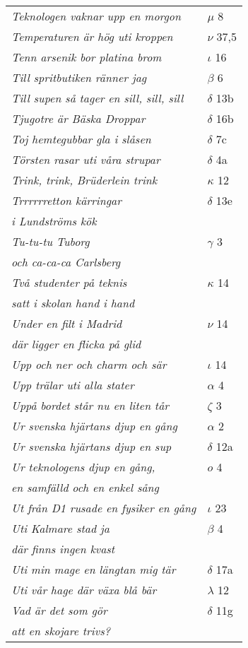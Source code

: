 \documentclass[a6paper,10pt]{article}
\begin{document}
\newpage
\setlength{\oddsidemargin}{-0.37in}
\begin{table}[!h]
\begin{tabular}{l l}
\textit{Teknologen vaknar upp en morgon}    &$\mu$ 8\\
\textit{Temperaturen är hög uti kroppen}	&$\nu$ 37,5\\
\textit{Tenn arsenik bor platina brom}	&$\iota$ 16\\
\textit{Till spritbutiken ränner jag}	&$\beta$ 6\\
\textit{Till supen så tager en sill, sill, sill}	&$\delta$ 13b\\
\textit{Tjugotre är Bäska Droppar}	&$\delta$ 16b\\
\textit{Toj hemtegubbar gla i slåsen}	&$\delta$ 7c\\
\textit{Törsten rasar uti våra strupar}	&$\delta$ 4a\\
\textit{Trink, trink, Brüderlein trink}	&$\kappa$ 12\\
\textit{Trrrrrretton kärringar}	&$\delta$ 13e\\
\textit{i Lundströms kök} &\\
\textit{Tu-tu-tu Tuborg}	&$\gamma$ 3\\
\textit{och ca-ca-ca Carlsberg} &\\
\textit{Två studenter på teknis}	&$\kappa$ 14\\
\textit{satt i skolan hand i hand} &\\
\textit{Under en filt i Madrid}	&$\nu$ 14\\
\textit{där ligger en flicka på glid} &\\
\textit{Upp och ner och charm och sär}	&$\iota$ 14\\
\textit{Upp trälar uti alla stater}	&$\alpha$ 4\\
\textit{Uppå bordet står nu en liten tår}	&$\zeta$ 3\\
\textit{Ur svenska hjärtans djup en gång}	&$\alpha$ 2\\
\textit{Ur svenska hjärtans djup en sup}	&$\delta$ 12a\\
\textit{Ur teknologens djup en gång,}	&$o$ 4\\
\textit{en samfälld och en enkel sång} &\\
\textit{Ut från D1 rusade en fysiker en gång} &$\iota$ 23\\
\textit{Uti Kalmare stad ja}	&$\beta$ 4\\
\textit{där finns ingen kvast} &\\
\textit{Uti min mage en längtan mig tär}	&$\delta$ 17a\\
\textit{Uti vår hage där växa blå bär}	&$\lambda$ 12\\
\textit{Vad är det som gör}	&$\delta$ 11g\\
\textit{att en skojare trivs?} &\\
\end{tabular}
\end{table}
\end{document}
